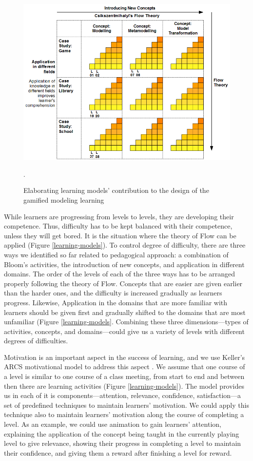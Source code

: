\documentclass[12pt, a4paper]{report}
\begin{document}
\begin{figure}[ht]
\centering
\includegraphics[width=\textwidth]{learning-models2}
\caption{Elaborating learning models' contribution to the design of the gamified modeling learning}.
\label{learning-models2}
\end{figure}

While learners are progressing from levels to levels, they are developing their competence. Thus, difficulty has to be kept balanced with their competence, unless they will get bored. It is the situation where the theory of Flow can be applied (Figure \ref{learning-models}). To control degree of difficulty, there are three ways we identified so far related to pedagogical approach: a combination of Bloom's activities, the introduction of new concepts, and application in different domains. The order of the levels of each of the three ways has to be arranged properly following the theory of Flow. Concepts that are easier are given earlier than the harder ones, and the difficulty is increased gradually as learners progress. Likewise, Application in the domains that are more familiar with learners should be given first and gradually shifted to the domains that are most unfamiliar (Figure \ref{learning-models}. Combining these three dimensions---types of activities, concepts, and domains---could give us a variety of levels with different degrees of difficulties.

Motivation is an important aspect in the success of learning, and we use Keller's ARCS motivational model to address this aspect \cite{keller2010motivational}. We assume that one course of a level is similar to one course of a class meeting, from start to end and between then there are learning activities (Figure \ref{learning-models}). The model provides us in each of it is components---attention, relevance, confidence, satisfaction---a set of predefined techniques to maintain learners' motivation. We could apply this technique also to maintain learners' motivation along the course of completing a level. As an example, we could use animation to gain learners' attention, explaining the application of the concept being taught in the currently playing level to give relevance, showing their progress in completing a level to maintain their confidence, and giving them a reward after finishing a level for reward.
 
\end{document}
